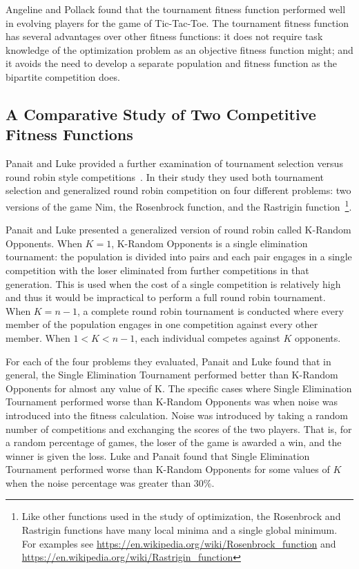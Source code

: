 Angeline and Pollack found that the tournament fitness function performed well
in evolving players for the game of Tic-Tac-Toe. The tournament fitness function
has several advantages over other fitness functions: it does not require task
knowledge of the optimization problem as an objective fitness function might;
and it avoids the need to develop a separate population and fitness function as
the bipartite competition does.

\subsection{A Comparative Study of Two Competitive Fitness Functions}

Panait and Luke provided a further examination of tournament selection versus
round robin style competitions~\cite{Panait02acomparative}. In their study they
used both tournament selection and generalized round robin competition on four
different problems: two versions of the game Nim, the Rosenbrock function, and
the Rastrigin function~\footnote{Like other functions used in the study of
optimization, the Rosenbrock and Rastrigin functions have many local minima and
a single global minimum. For examples see
\url{https://en.wikipedia.org/wiki/Rosenbrock_function} and
\url{https://en.wikipedia.org/wiki/Rastrigin_function}}.

Panait and Luke presented a generalized version of round robin called K-Random
Opponents. When \(K=1\), K-Random Opponents is a single elimination
tournament: the population is divided into pairs and each pair engages in a
single competition with the loser eliminated from further competitions in that
generation. This is used when the cost of a single competition is relatively
high and thus it would be impractical to perform a full round robin tournament.
When \(K=n-1\), a complete round robin tournament is conducted where every
member of the population engages in one competition against every other member.
When \(1 < K < n-1\), each individual competes against \(K\) opponents.

For each of the four problems they evaluated, Panait and Luke found that in
general, the Single Elimination Tournament performed better than K-Random
Opponents for almost any value of K. The specific cases where Single Elimination
Tournament performed worse than K-Random Opponents was when noise was introduced
into the fitness calculation. Noise was introduced by taking a random number of
competitions and exchanging the scores of the two players. That is, for a random
percentage of games, the loser of the game is awarded a win, and the winner is
given the loss. Luke and Panait found that Single Elimination Tournament
performed worse than K-Random Opponents for some values of \(K\) when the noise
percentage was greater than 30\%.

